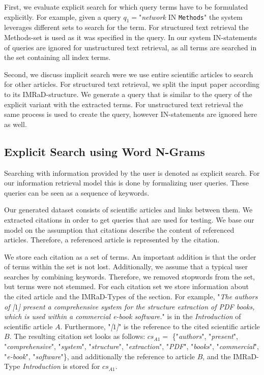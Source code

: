 First, we evaluate explicit search for which query terms have to be formulated explicitly. For example, given a query $q_1=$"\textit{network} IN \texttt{Methods}" the system leverages different sets to search for the term. For structured text retrieval the Methods-set is used as it was specified in the query. In our system IN-statements of queries are ignored for unstructured text retrieval, as all terms are searched in the set containing all index terms.

Second, we discuss implicit search were we use entire scientific articles to search for other articles. For structured text retrieval, we split the input paper according to its IMRaD-structure. We generate a query that is similar to the query of the explicit variant with the extracted terms. For unstructured text retrieval the same process is used to create the query, however IN-statements are ignored here as well.


\subsection{Explicit Search using Word N-Grams}
\label{sec:explicit_search_ngrams}

Searching with information provided by the user is denoted as explicit search. For our information retrieval model this is done by formalizing user queries. These queries can be seen as a sequence of keywords.

Our generated dataset consists of scientific articles and links between them. We extracted citations in order to get queries that are used for testing. We base our model on the assumption that citations describe the content of referenced articles. Therefore, a referenced article is represented by the citation.

We store each citation as a set of terms. An important addition is that the order of terms within the set is not lost. Additionally, we assume that a typical user searches by combining keywords. Therefore, we removed stopwords from the set, but terms were not stemmed. For each citation set we store information about the cited article and the IMRaD-Types of the section. For example, "\textit{The authors of [$1$] present a comprehensive system for the structure extraction of PDF books, which is used within a commercial e-book software.}" is in the \textit{Introduction} of scientific article $A$. Furthermore, "\textit{[$1$]}" is the reference to the cited scientific article $B$. The resulting citation set looks as follows: $cs_{A1} =$ \{"\textit{authors}", "\textit{present}", "\textit{comprehensive}", "\textit{system}", "\textit{structure}", "\textit{extraction}", "\textit{PDF}", "\textit{books}", "\textit{commercial}", "\textit{e-book}", "\textit{software}"\}, and additionally the reference to article $B$, and the IMRaD-Type \textit{Introduction} is stored for $cs_{A1}$.

